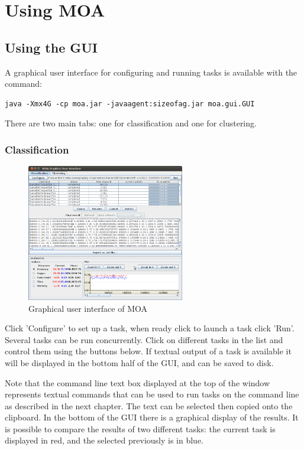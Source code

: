 \documentclass[a4paper,12pt,twoside]{book}
\begin{document}
\chapter{Using MOA}
\section{Using the GUI}
A graphical user interface for configuring and running tasks is available with the command:

\begin{verbatim}
java -Xmx4G -cp moa.jar -javaagent:sizeofag.jar moa.gui.GUI
\end{verbatim}

There are two main tabs: one for classification and one for clustering.

\subsection{Classification}

\begin{figure}[ht]
\begin{center}
\includegraphics[height=6cm]{images/MOA_Task.png}\end{center}
\caption{Graphical user interface of MOA}
\end{figure}

Click 'Configure' to set up a task, when ready click to launch a task click 'Run'. Several tasks can be run concurrently. Click on different tasks in the list and control them using the buttons below. If textual output of a task is available it will be displayed in the bottom half of the GUI, and can be saved to disk.

Note that the command line text box displayed at the top of the window represents textual commands that can be used to run tasks on the command line as described in the next chapter.
The text can be selected then copied onto the clipboard. 
In the bottom of the GUI there is a graphical display of the results. It is possible
to compare the results of two different tasks: the current task is displayed in red, and the selected previously is in blue. 
\end{document}
